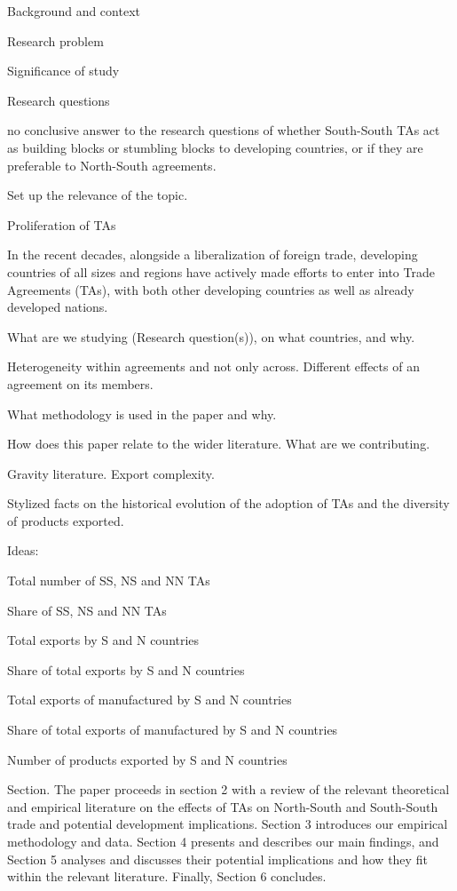 Background and context

Research problem

Significance of study

Research questions

no conclusive answer to the research questions of whether South-South
TAs act as building blocks or stumbling blocks to developing countries,
or if they are preferable to North-South agreements.

Set up the relevance of the topic.

Proliferation of TAs

In the recent decades, alongside a liberalization of foreign trade,
developing countries of all sizes and regions have actively made efforts
to enter into Trade Agreements (TAs), with both other developing
countries as well as already developed nations.

What are we studying (Research question(s)), on what countries, and why.

Heterogeneity within agreements and not only across. Different effects
of an agreement on its members.

What methodology is used in the paper and why.

How does this paper relate to the wider literature. What are we
contributing.

Gravity literature. Export complexity.

Stylized facts on the historical evolution of the adoption of TAs and
the diversity of products exported.

Ideas:

Total number of SS, NS and NN TAs

Share of SS, NS and NN TAs

Total exports by S and N countries

Share of total exports by S and N countries

Total exports of manufactured by S and N countries

Share of total exports of manufactured by S and N countries

Number of products exported by S and N countries

Section. The paper proceeds in section 2 with a review of the relevant
theoretical and empirical literature on the effects of TAs on
North-South and South-South trade and potential development
implications. Section 3 introduces our empirical methodology and data.
Section 4 presents and describes our main findings, and Section 5
analyses and discusses their potential implications and how they fit
within the relevant literature. Finally, Section 6 concludes.
